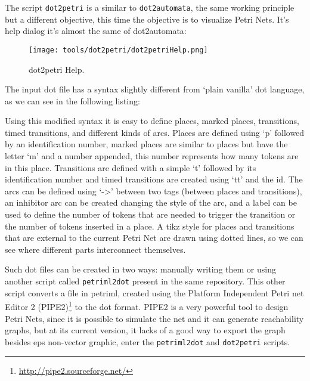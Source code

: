The script \verb|dot2petri| is a similar to \verb|dot2automata|, the same
working principle but a different objective, this time the objective is to
visualize Petri Nets. It's help dialog it's almost the same of dot2automata:

\begin{figure}[H]
  \centering
  \texttt{[image: tools/dot2petri/dot2petriHelp.png]}
  \caption{dot2petri Help.}
  \label{fig:dot2petriHelp}
\end{figure}

The input dot file has a syntax slightly different from `plain vanilla' dot
language, as we can see in the following listing:



Using this modified syntax it is easy to define places, marked places,
transitions, timed transitions, and different kinds of arcs. Places are defined
using `p' followed by an identification number, marked places are similar to
places but have the letter `m' and a number appended, this number represents how
many tokens are in this place. Transitions are defined with a simple `t'
followed by its identification number and timed transitions are created using `tt' and the
id. The arcs can be defined using `->' between two tags (between places and
transitions), an inhibitor arc can be created changing the style of the arc, and
a label can be used to define the number of tokens that are needed to trigger
the transition or the number of tokens inserted in a place. A tikz style for places
and transitions that are external to the current Petri Net are drawn using
dotted lines, so we can see where different parts interconnect themselves.

Such dot files can be created in two ways: manually writing them or using
another script called \verb|petriml2dot| present in the same repository. This
other script converts a file in petriml, created using the Platform Independent Petri
net Editor 2 (PIPE2)\footnote{\url{http://pipe2.sourceforge.net/}} to the dot
format.
PIPE2 is a very powerful tool to design Petri Nets, since it is possible to simulate the
net and it can generate reachability graphs, but at its current version, it lacks of a
good way to export the graph besides eps non-vector graphic, enter the \verb|petriml2dot| and \verb|dot2petri| scripts.

